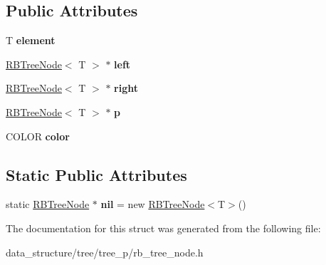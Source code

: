\subsection*{Public Attributes}
\begin{DoxyCompactItemize}
\item 
\mbox{\label{structRBTreeNode_a66086a6ccff375f485d447836fe5c97c}} 
T {\bfseries element}
\item 
\mbox{\label{structRBTreeNode_a9a848dad720599a9669b3eefbfe6f258}} 
\hyperlink{structRBTreeNode}{R\+B\+Tree\+Node}$<$ T $>$ $\ast$ {\bfseries left}
\item 
\mbox{\label{structRBTreeNode_aebfeee7f7a5e16bc302a0c4973c2f3ed}} 
\hyperlink{structRBTreeNode}{R\+B\+Tree\+Node}$<$ T $>$ $\ast$ {\bfseries right}
\item 
\mbox{\label{structRBTreeNode_a8dbffe97c5d8402b59eb653b2598c1c0}} 
\hyperlink{structRBTreeNode}{R\+B\+Tree\+Node}$<$ T $>$ $\ast$ {\bfseries p}
\item 
\mbox{\label{structRBTreeNode_a68e427bce0961318d678c47a8ac706a5}} 
C\+O\+L\+OR {\bfseries color}
\end{DoxyCompactItemize}
\subsection*{Static Public Attributes}
\begin{DoxyCompactItemize}
\item 
\mbox{\label{structRBTreeNode_aaf39e40ebd40db6ed1493b6ae262dc9d}} 
static \hyperlink{structRBTreeNode}{R\+B\+Tree\+Node} $\ast$ {\bfseries nil} = new \hyperlink{structRBTreeNode}{R\+B\+Tree\+Node}$<$T$>$()
\end{DoxyCompactItemize}


The documentation for this struct was generated from the following file\+:\begin{DoxyCompactItemize}
\item 
data\+\_\+structure/tree/tree\+\_\+p/rb\+\_\+tree\+\_\+node.\+h\end{DoxyCompactItemize}
